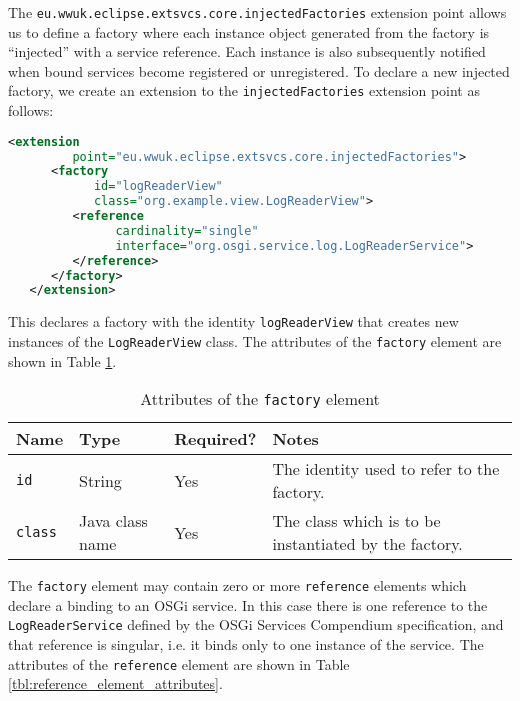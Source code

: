 \documentclass[12pt]{article}
\begin{document}
The \texttt{eu.wwuk.eclipse.extsvcs.core.injectedFactories} extension point allows us to define a factory where each instance object generated from the factory is ``injected'' with a service reference. Each instance is also subsequently notified when bound services become registered or unregistered. To declare a new injected factory, we create an extension to the \texttt{injected\-Fac\-tories} extension point as follows:

\begin{lstlisting}[language=xml]
   <extension
         point="eu.wwuk.eclipse.extsvcs.core.injectedFactories">
      <factory
            id="logReaderView"
            class="org.example.view.LogReaderView">
         <reference
               cardinality="single"
               interface="org.osgi.service.log.LogReaderService">
         </reference>
      </factory>
   </extension>
\end{lstlisting}

This declares a factory with the identity \texttt{logReaderView} that creates new instances of the \texttt{LogReaderView} class. The attributes of the \texttt{factory} element are shown in Table \ref{tbl:factory_element_attributes}.

\begin{table}
	\centering
	\begin{tabular}{|l|l|l|p{6cm}|}
	\hline
	Name & Type & Required? & Notes \\
	\hline
	\texttt{id} & String & Yes & The identity used to refer to the factory. \\
	\hline
	\texttt{class} & Java class name & Yes & The class which is to be instantiated by the factory.\\
	\hline
	\end{tabular}
	\caption{Attributes of the \texttt{factory} element}
	\label{tbl:factory_element_attributes}
\end{table}

The \texttt{factory} element may contain zero or more \texttt{reference} elements which declare a binding to an OSGi service. In this case there is one reference to the \texttt{LogReaderService} defined by the OSGi Services Compendium specification, and that reference is singular, i.e. it binds only to one instance of the service. The attributes of the \texttt{reference} element are shown in Table \ref{tbl:reference_element_attributes}.
\end{document}
